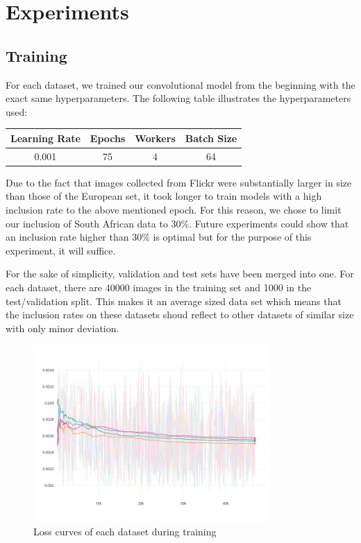 \documentclass[conference]{IEEEtran}
\begin{document}
\section{Experiments}

%
%
%
%
%

\subsection{Training}

For each dataset, we trained our convolutional model from the beginning with the exact same hyperparameters. The following table illustrates the hyperparameters used:


\begin{table}[h!]
\centering
\renewcommand{\arraystretch}{1.5}
\begin{tabular}{|c|c|c|c|}
\hline 
Learning Rate & Epochs & Workers & Batch Size \\ 
\hline 
0.001 & 75 & 4 & 64 \\ 
\hline 
\end{tabular} 
\end{table}

Due to the fact that images collected from Flickr were substantially larger in size than those of the European set, it took longer to train models with a high inclusion rate to the above mentioned epoch. For this reason, we chose to limit our inclusion of South African data to 30\%. Future experiments could show that an inclusion rate higher than 30\% is optimal but for the purpose of this experiment, it will suffice.

For the sake of simplicity, validation and test sets have been merged into one. For each dataset, there are 40000 images in the training set and 1000 in the test/validation split. This makes it an average sized data set which means that the inclusion rates on these datasets shoud reflect to other datasets of similar size with only minor deviation.

\begin{figure}[h!]
\centering
\includegraphics[width=9cm]{Curves/loss_train}
\caption{Loss curves of each dataset during training}
\label{fig:loss_train}
\end{figure}
\end{document}
